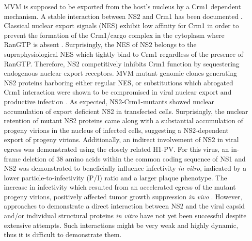 MVM is supposed to be exported from the host’s nucleus by a Crm1 dependent mechanism. A stable interaction between NS2 and Crm1 has been documented \cite{pmid10438867, pmid10527855}. Classical nuclear export signals (NES) exhibit low affinity for Crm1 in order to prevent the formation of the Crm1/cargo complex in the cytoplasm where RanGTP is absent \cite{pmid10449743}. Surprisingly, the NES of NS2 belongs to the supraphysiological NES which tightly bind to Crm1 regardless of the presence of RanGTP. Therefore, NS2 competitively inhibits Crm1 function by sequestering endogenous nuclear export receptors. MVM mutant genomic clones generating NS2 proteins harboring either regular NES, or substitutions which abrogated Crm1 interaction were shown to be compromised in viral nuclear export and productive infection \cite{pmid18385513}. As expected, NS2-Crm1-mutants showed nuclear accumulation of export deficient NS2 in transfected cells. Surprisingly, the nuclear retention of mutant NS2 proteins came along with a substantial accumulation of progeny virions in the nucleus of infected cells, suggesting a NS2-dependent export of progeny virions. Additionally, an indirect involvement of NS2 in viral egress was demonstrated using the closely related H1-PV. For this virus, an in-frame deletion of 38 amino acids within the common coding sequence of NS1 and NS2 was demonstrated to beneficially influence infectivity \textit{in vitro}, indicated by a lower particle-to-infectivity (P/I) ratio and a larger plaque phenotype. The increase in infectivity which resulted from an accelerated egress of the mutant progeny virions, positively affected tumor growth suppression \textit{in vivo} \cite{pmid22553326}. However, approaches to demonstrate a direct interaction between NS2 and the viral capsid and/or individual structural proteins \textit{in vitro} have not yet been successful despite extensive attempts. Such interactions might be very weak and highly dynamic, thus it is difficult to demonstrate them.  


